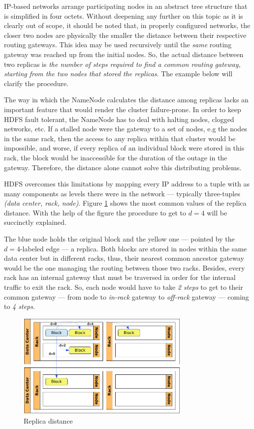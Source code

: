 IP-based networks arrange participating nodes in an abstract tree structure that is simplified in four octets. Without deepening any further on this topic as it is clearly out of scope, it should be noted that, in properly configured networks, the closer two nodes are physically the smaller the distance between their respective routing gateways. This idea may be used recursively until the \emph{same} routing gateway was reached up from the initial nodes. So, the actual distance between two replicas is \emph{the number of steps required to find a common routing gateway, starting from the two nodes that stored the replicas}. The example below will clarify the procedure.

The way in which the NameNode calculates the distance among replicas lacks an  important feature that would render the cluster failure-prone. In order to keep HDFS fault tolerant, the NameNode has to deal with halting nodes, clogged networks, etc. If a stalled node were the gateway to a set of nodes, e.g the nodes in the same rack, then the access to any replica within that cluster would be impossible, and worse, if every replica of an individual block were stored in this rack, the block would be inaccessible for the duration of the outage in the gateway. Therefore, the distance alone cannot solve this distributing problems.

HDFS overcomes this limitations by mapping every IP address to a tuple with as many components as levels there were in the network --- typically three-tuples \emph{(data center, rack, node)}. Figure \ref{fig:distnodos} shows the most common values of the replica distance. With the help of the figure the procedure to get to $d=4$ will be succinctly explained.

The blue node holds the original block and the yellow one --- pointed by the $d=4$-labeled edge --- a replica. Both blocks are stored in nodes within the same data center but in different racks, thus, their nearest common ancestor gateway would be the one managing the routing between those two racks. Besides, every rack has an internal gateway that must be traversed in order for the internal traffic to exit the rack. So, each node would have to take \emph{2 steps} to get to their common gateway --- from node to \emph{in-rack} gateway to \emph{off-rack} gateway --- coming to \emph{4 steps}.

\begin{figure}[tbp]
\begin{center}
\includegraphics[width=0.75\textwidth]{imagenes/018.pdf}
 \caption{Replica distance}
\label{fig:distnodos}
\end{center}
\end{figure}

